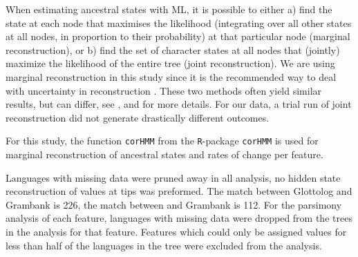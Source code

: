 \documentclass[a4paper,10pt]{article} %
\begin{document}
When estimating ancestral states with ML, it is possible to either a) find the state at each node that maximises the likelihood (integrating over all other states at all nodes, in proportion to their probability) at that particular node (marginal reconstruction), or b) find the set of character states at all nodes that (jointly) maximize the likelihood of the entire tree (joint reconstruction). We are using marginal reconstruction in this study since it is the recommended way to deal with uncertainty in reconstruction \citep{revell_2014}. These two methods often yield similar results, but can differ, see \citet[259-260]{felsenstein2004inferring},  \citet[121-126]{yang2006computational} and \citet[5]{joy2016ancestral} for more details. For our data, a trial run of joint reconstruction did not generate drastically different outcomes.

For this study, the function \texttt{corHMM} from the \texttt{R}-package \texttt{corHMM} \citep{corHMM} is used for marginal reconstruction of ancestral states and rates of change per feature. %


Languages with missing data were pruned away in all analysis, no hidden state reconstruction of values at tips was preformed. The match between Glottolog and Grambank is 226, the match between \citet{grayetal_2009} and Grambank is 112. For the parsimony analysis of each feature, languages with missing data were dropped from the trees in the analysis for that feature. Features which could only be assigned values for less than half of the languages in the tree were excluded from the analysis.
\end{document}
